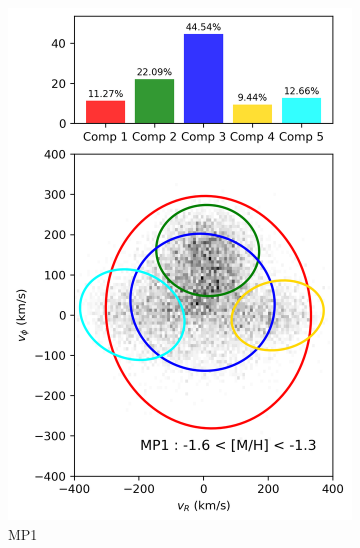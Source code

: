 \documentclass[a4paper,10pt]{article}
\begin{document}
\begin{multicols}{2}
\begin{figure}[H]
\begin{subfigure}[t]{0.24\linewidth}
    \includegraphics[width=\linewidth]{../figures/gmm_MP1.png}
    \caption{MP1}
    \label{fig:gmm_mp1}
  \end{subfigure}
  \hfill
  \begin{subfigure}[t]{0.24\linewidth}

\end{subfigure}
\end{figure}
\end{multicols}
\end{document}
